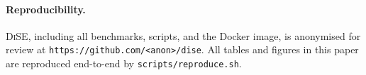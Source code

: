 \documentclass[runningheads]{llncs}
\newcommand{\toolname}{\textsc{DiSE}}
\newcommand{\code}[1]{\texttt{#1}}
\begin{document}
\paragraph{Reproducibility.}
\toolname{}, including all benchmarks, scripts, and the Docker image,
is anonymised for review at \code{https://github.com/<anon>/dise}.
All tables and figures in this paper are reproduced end-to-end by
\code{scripts/reproduce.sh}.




\end{document}
